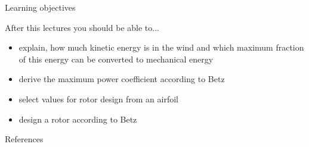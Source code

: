\begin{frame}{Learning objectives}  	
\begin{block}{After this lectures you should be able to...}
	\begin{itemize}
		\item explain, how much kinetic energy is in the wind and which maximum fraction of this energy can be converted to mechanical energy
		\item derive the maximum power coefficient according to Betz
		\item select values for rotor design from an airfoil
		\item design a rotor according to Betz
	\end{itemize}
\end{block}
\end{frame}
\begin{frame}{References}
\printbibliography[heading=none]
\end{frame}
